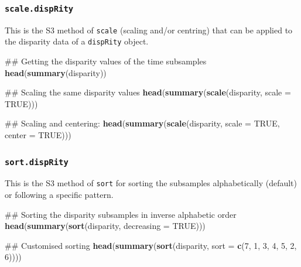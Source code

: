 \documentclass[]{book}
\newenvironment{Shaded}{\begin{snugshade}}{\end{snugshade}}
\newcommand{\KeywordTok}[1]{\textcolor[rgb]{0.13,0.29,0.53}{\textbf{#1}}}
\newcommand{\DataTypeTok}[1]{\textcolor[rgb]{0.13,0.29,0.53}{#1}}
\newcommand{\DecValTok}[1]{\textcolor[rgb]{0.00,0.00,0.81}{#1}}
\newcommand{\OtherTok}[1]{\textcolor[rgb]{0.56,0.35,0.01}{#1}}
\newcommand{\NormalTok}[1]{#1}
\theoremstyle{definition}
\theoremstyle{definition}
\theoremstyle{remark}
\begin{document}
\subsubsection{\texorpdfstring{\texttt{scale.dispRity}}{scale.dispRity}}\label{scale.disprity}

This is the S3 method of \texttt{scale} (scaling and/or centring) that
can be applied to the disparity data of a \texttt{dispRity} object.

\begin{Shaded}
\begin{Highlighting}[]
\NormalTok{## Getting the disparity values of the time subsamples}
\KeywordTok{head}\NormalTok{(}\KeywordTok{summary}\NormalTok{(disparity))}

\NormalTok{## Scaling the same disparity values}
\KeywordTok{head}\NormalTok{(}\KeywordTok{summary}\NormalTok{(}\KeywordTok{scale}\NormalTok{(disparity, }\DataTypeTok{scale =} \OtherTok{TRUE}\NormalTok{)))}

\NormalTok{## Scaling and centering:}
\KeywordTok{head}\NormalTok{(}\KeywordTok{summary}\NormalTok{(}\KeywordTok{scale}\NormalTok{(disparity, }\DataTypeTok{scale =} \OtherTok{TRUE}\NormalTok{, }\DataTypeTok{center =} \OtherTok{TRUE}\NormalTok{)))}
\end{Highlighting}
\end{Shaded}

\subsubsection{\texorpdfstring{\texttt{sort.dispRity}}{sort.dispRity}}\label{sort.disprity}

This is the S3 method of \texttt{sort} for sorting the subsamples
alphabetically (default) or following a specific pattern.

\begin{Shaded}
\begin{Highlighting}[]
\NormalTok{## Sorting the disparity subsamples in inverse alphabetic order}
\KeywordTok{head}\NormalTok{(}\KeywordTok{summary}\NormalTok{(}\KeywordTok{sort}\NormalTok{(disparity, }\DataTypeTok{decreasing =} \OtherTok{TRUE}\NormalTok{)))}

\NormalTok{## Customised sorting}
\KeywordTok{head}\NormalTok{(}\KeywordTok{summary}\NormalTok{(}\KeywordTok{sort}\NormalTok{(disparity, }\DataTypeTok{sort =} \KeywordTok{c}\NormalTok{(}\DecValTok{7}\NormalTok{, }\DecValTok{1}\NormalTok{, }\DecValTok{3}\NormalTok{, }\DecValTok{4}\NormalTok{, }\DecValTok{5}\NormalTok{, }\DecValTok{2}\NormalTok{, }\DecValTok{6}\NormalTok{))))}
\end{Highlighting}
\end{Shaded}
\end{document}

